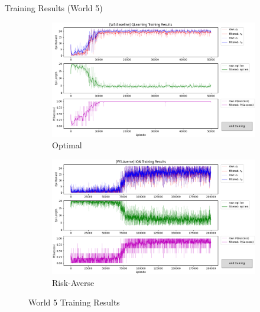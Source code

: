 \documentclass[aspectratio=1610, xcolor=dvipsnames]{packages/beamer}
\begin{document}
\begin{frame}{Training Results (World 5)}
     \begin{figure}
     \centering
          \begin{subfigure}[b]{\Wfig\textwidth}  \centering
              \includegraphics[width=\textwidth]{../results/IDQN_W5/Fig_W5_JointQ_Baseline}
              \caption{Optimal} \label{fig:W5baseline}
          \end{subfigure}
          \hfill
         \begin{subfigure}[b]{\Wfig\textwidth} \centering
             \includegraphics[width=\textwidth]{../results/IDQN_W5/Fig_W5_JointQ_Averse}
             \caption{Risk-Averse} \label{fig:W5averse}
         \end{subfigure}
    \caption{World 5 Training Results}
    \label{fig:W5}
    \end{figure}
\end{frame}
\end{document}
